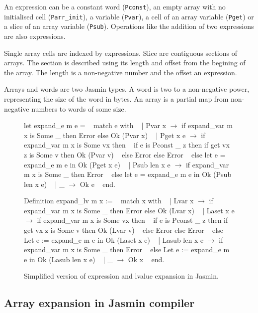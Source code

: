 \documentclass{article}
\begin{document}
An expression can be a constant word (\texttt{Pconst}), an empty array with no
initialised cell (\texttt{Parr\_init}), a variable (\texttt{Pvar}), a cell of an
array variable (\texttt{Pget}) or a slice of an array variable (\texttt{Psub}).
Operations like the addition of two expressions are also expressions.

Single array cells are indexed by expressions. Slice are contiguous sections of
arrays. The section is described using its length and offset from the begining
of the array. The length is a non-negative number and the offset an expression.

\smallskip

Arrays and words are two Jasmin types. A word is two to a non-negative power,
representing the size of the word in bytes. An array is a partial map from
non-negative numbers to words of some size.


\begin{figure}[t]
\obeylines\obeyspaces\ttfamily%
let expand\_e m e = 
~ match e with
~ | Pvar x \(\rightarrow\) if expand\_var m x is Some \_ then Error else Ok (Pvar x)
~ | Pget x e \(\rightarrow\) if expand\_var m x is Some vx then
~     if e is Pconst \_ z then if get vx z is Some v then Ok (Pvar v)
~     else Error else Error
~   else let e = expand\_e m e in Ok (Pget x e)
~ | Psub len x e \(\rightarrow\) if expand\_var m x is Some \_ then Error
~   else let e = expand\_e m e in Ok (Psub len x e)
~ | \_ \(\rightarrow\) Ok e
~ end.

Definition expand\_lv m x :=
~ match x with
~ | Lvar x \(\rightarrow\) if expand\_var m x is Some \_ then Error else Ok (Lvar x)
~ | Laset x e \(\rightarrow\) if expand\_var m x is Some vx then
~     if e is Pconst \_ z then if get vx z is Some v then Ok (Lvar v)
~     else Error else Error
~   else Let e := expand\_e m e in Ok (Laset x e)
~ | Lasub len x e \(\rightarrow\) if expand\_var m x is Some \_ then Error
~   else Let e := expand\_e m e in Ok (Lasub len x e)
~ | \_ \(\rightarrow\) Ok x
~ end.
\normalfont%
\caption{Simplified version of expression and lvalue expansion in Jasmin.}
\end{figure}

\subsection{Array expansion in Jasmin compiler}
\end{document}
